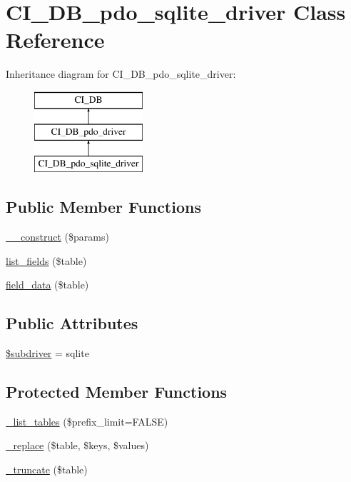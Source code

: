 \hypertarget{class_c_i___d_b__pdo__sqlite__driver}{}\section{C\+I\+\_\+\+D\+B\+\_\+pdo\+\_\+sqlite\+\_\+driver Class Reference}
\label{class_c_i___d_b__pdo__sqlite__driver}
Inheritance diagram for C\+I\+\_\+\+D\+B\+\_\+pdo\+\_\+sqlite\+\_\+driver\+:\begin{figure}[H]
\begin{center}
\leavevmode
\includegraphics[height=3.000000cm]{class_c_i___d_b__pdo__sqlite__driver}
\end{center}
\end{figure}
\subsection*{Public Member Functions}
\begin{DoxyCompactItemize}
\item 
\mbox{\hyperlink{class_c_i___d_b__pdo__sqlite__driver_a9162320adff1a1a4afd7f2372f753a3e}{\+\_\+\+\_\+construct}} (\$params)
\item 
\mbox{\hyperlink{class_c_i___d_b__pdo__sqlite__driver_aef08cd376b16b24608100ca0e3f2f85b}{list\+\_\+fields}} (\$table)
\item 
\mbox{\hyperlink{class_c_i___d_b__pdo__sqlite__driver_a90355121e1ed009e0efdbd544ab56efa}{field\+\_\+data}} (\$table)
\end{DoxyCompactItemize}
\subsection*{Public Attributes}
\begin{DoxyCompactItemize}
\item 
\mbox{\hyperlink{class_c_i___d_b__pdo__sqlite__driver_a1322ca756348b11d080cb7a4f590de15}{\$subdriver}} = \textquotesingle{}sqlite\textquotesingle{}
\end{DoxyCompactItemize}
\subsection*{Protected Member Functions}
\begin{DoxyCompactItemize}
\item 
\mbox{\hyperlink{class_c_i___d_b__pdo__sqlite__driver_a435c0f3ce54fe7daa178baa8532ebd54}{\+\_\+list\+\_\+tables}} (\$prefix\+\_\+limit=F\+A\+L\+SE)
\item 
\mbox{\hyperlink{class_c_i___d_b__pdo__sqlite__driver_ae0adf73984daf2d42ad29b66c484c82b}{\+\_\+replace}} (\$table, \$keys, \$values)
\item 
\mbox{\hyperlink{class_c_i___d_b__pdo__sqlite__driver_aa029600528fc1ce660a23ff4b4667f95}{\+\_\+truncate}} (\$table)
\end{DoxyCompactItemize}
